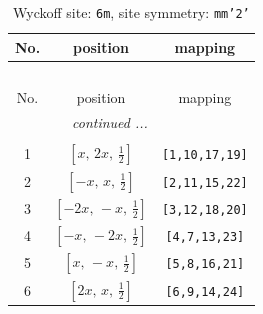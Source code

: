 \documentclass[fleqn,8pt]{jsarticle}
\begin{document}
\renewcommand{\arraystretch}{1.2}
\begin{longtable}{ccc}
\caption{Wyckoff site: {\tt 6m}, site symmetry: {\tt mm'2'}}
 \\
 \hline \hline
No. & position & mapping \\ \hline \endfirsthead

\multicolumn{2}{l}{\tablename\ \thetable{}} \\
 \hline \hline
No. & position & mapping \\ \hline \endhead

 \hline \hline
\multicolumn{2}{r}{\footnotesize\it continued ...} \\ \endfoot

 \hline \hline
\multicolumn{2}{r}{} \\ \endlastfoot

1 & $\left[ x,\, 2 x,\, \frac{1}{2} \right]$ & {\tt [1,10,17,19]} \\ \hline
2 & $\left[ - x,\, x,\, \frac{1}{2} \right]$ & {\tt [2,11,15,22]} \\ \hline
3 & $\left[ - 2 x,\, - x,\, \frac{1}{2} \right]$ & {\tt [3,12,18,20]} \\ \hline
4 & $\left[ - x,\, - 2 x,\, \frac{1}{2} \right]$ & {\tt [4,7,13,23]} \\ \hline
5 & $\left[ x,\, - x,\, \frac{1}{2} \right]$ & {\tt [5,8,16,21]} \\ \hline
6 & $\left[ 2 x,\, x,\, \frac{1}{2} \right]$ & {\tt [6,9,14,24]} \\
\end{longtable}
\renewcommand{\arraystretch}{1.2}
\end{document}
